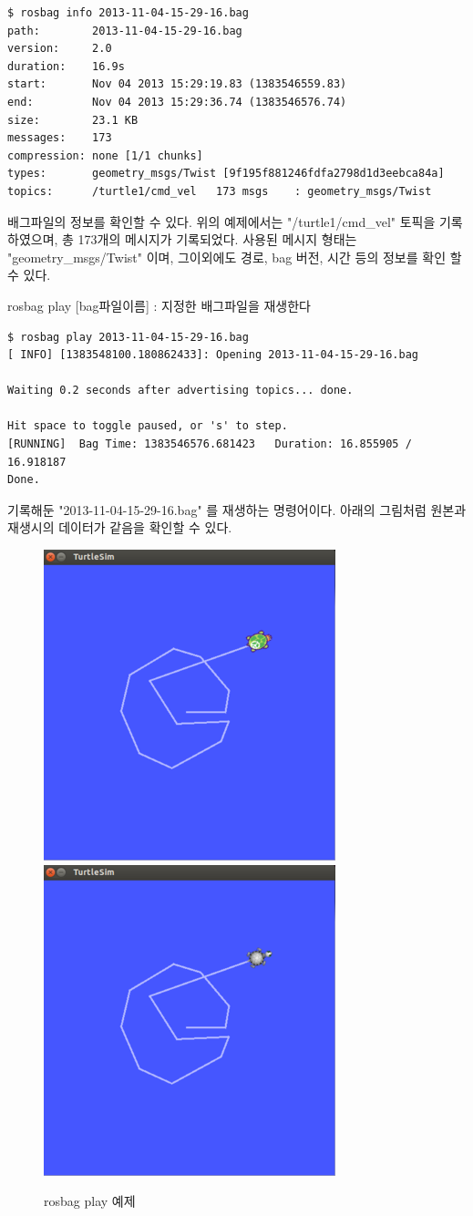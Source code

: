 \begin{lstlisting}[language=ROS]
$ rosbag info 2013-11-04-15-29-16.bag 
path:        2013-11-04-15-29-16.bag
version:     2.0
duration:    16.9s
start:       Nov 04 2013 15:29:19.83 (1383546559.83)
end:         Nov 04 2013 15:29:36.74 (1383546576.74)
size:        23.1 KB
messages:    173
compression: none [1/1 chunks]
types:       geometry_msgs/Twist [9f195f881246fdfa2798d1d3eebca84a]
topics:      /turtle1/cmd_vel   173 msgs    : geometry_msgs/Twist
\end{lstlisting}

\noindent
배그파일의 정보를 확인할 수 있다. 위의 예제에서는 "/turtle1/cmd\_vel" 토픽을 기록하였으며, 총 173개의 메시지가 기록되었다. 사용된 메시지 형태는 "geometry\_msgs/Twist" 이며, 그이외에도 경로, bag 버전, 시간 등의 정보를 확인 할 수 있다.

\vspace{\baselineskip}
\noindent
{}\circled{\thenum} rosbag play [bag파일이름] : 지정한 배그파일을 재생한다

\begin{lstlisting}[language=ROS]
$ rosbag play 2013-11-04-15-29-16.bag 
[ INFO] [1383548100.180862433]: Opening 2013-11-04-15-29-16.bag

Waiting 0.2 seconds after advertising topics... done.

Hit space to toggle paused, or 's' to step.
[RUNNING]  Bag Time: 1383546576.681423   Duration: 16.855905 / 16.918187     
Done.
\end{lstlisting}

\noindent
기록해둔 "2013-11-04-15-29-16.bag" 를 재생하는 명령어이다. 아래의 그림처럼 원본과 재생시의 데이터가 같음을 확인할 수 있다.

\begin{figure}[h]
\centering\includegraphics[width=0.4\columnwidth]{pictures/chapter5/rosbag_play1.png}
\centering\includegraphics[width=0.4\columnwidth]{pictures/chapter5/rosbag_play2.png}
\caption{rosbag play 예제}
\end{figure}

